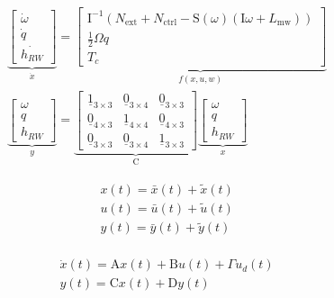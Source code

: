 \begin{equation}
	\begin{aligned}
		& \underbrace{\left[\begin{array}{c}
				\dot{\omega} \\
				\dot{q} \\
				\dot{h_{RW}}
			\end{array}\right]}_{\dot{x}}=\underbrace{\left[\begin{array}{c}
				{\mathrm{I}}^{-1}\left(N_{\mathrm{ext}}+N_{\mathrm{ctrl}}-{\mathrm{S}}(\omega)\left({\mathrm{I}} \omega+L_{\mathrm{mw}}\right)\right) \\
				\frac{1}{2} {\Omega} q \\
				T_c
			\end{array}\right]}_{f(x,u,w)}\\[10pt]
		& \underbrace{\left[\begin{array}{c}
				\omega \\
				q \\
				h_{RW}
			\end{array}\right]}_y=\underbrace{\left[\begin{array}{ccc}
				\underline{1}_{3 \times 3} & \underline{0}_{3 \times 4} & \underline{0}_{3 \times 3}\\
				\underline{0}_{4 \times 3} & \underline{1}_{4 \times 4} & \underline{0}_{4 \times 3} \\
				\underline{0}_{3 \times 3} & \underline{0}_{3 \times 4} & \underline{1}_{3 \times 3}
			\end{array}\right]}_{{\mathrm{C}}} \underbrace{\left[\begin{array}{c}
				\omega \\
				q \\
				h_{RW}
			\end{array}\right]}_x
	\end{aligned}	
\end{equation}



\begin{equation}
	\begin{aligned}
		& x(t) =\bar{x}(t)+ \tilde{x}(t) \\
		& u(t) =\bar{u}(t)+ \tilde{u}(t) \\
		& y(t) =\bar{y}(t)+ \tilde{y}(t) \\
	\end{aligned}
\end{equation}	

\begin{equation}
	\begin{aligned}
		& \dot{x}(t) =\mathrm{A}x(t)+ \mathrm{B}u(t)+ \Gamma u_d(t)\\
		& y(t) =\mathrm{C}x(t)+ \mathrm{D}y(t)		
	\end{aligned}
\end{equation}	


